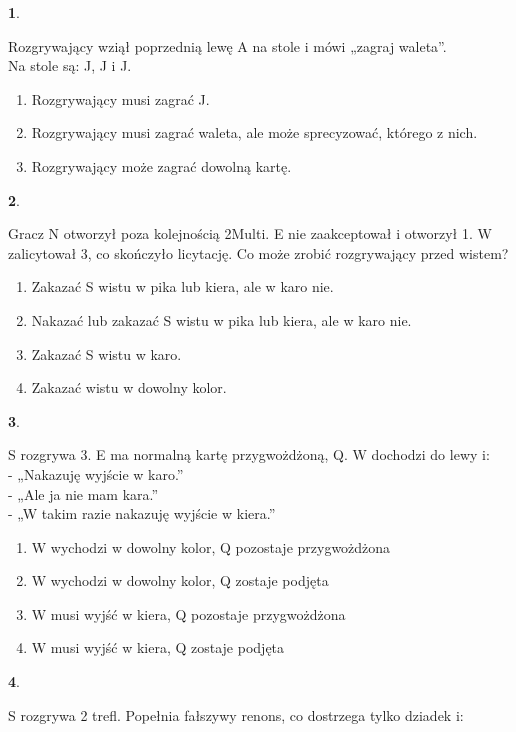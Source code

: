 \documentclass[12pt, a4paper]{article}
\newtheorem{pyt}{}
\begin{document}
\begin{pyt} 
\end{pyt}
Rozgrywający wziął poprzednią lewę \xdiams A na stole i mówi „zagraj waleta”. \\ Na stole są: \xclubs J, \xdiams J i \xspades J.
\begin{enumerate}[label=\alph*.]
\item Rozgrywający musi zagrać \xdiams J.
\item Rozgrywający musi zagrać waleta, ale może sprecyzować, którego z nich.
\item Rozgrywający może zagrać dowolną kartę.
\end{enumerate}


\begin{pyt} 
\end{pyt}
Gracz N otworzył poza kolejnością 2\diams Multi. E nie
zaakceptował i otworzył 1\nt. W zalicytował 3\nt, co skończyło licytację. Co może zrobić rozgrywający przed wistem?
\begin{enumerate}[label=\alph*.]
\item Zakazać S wistu w pika lub kiera, ale w karo nie.
\item Nakazać lub zakazać S wistu w pika lub kiera, ale w karo nie.
\item Zakazać S wistu w karo.
\item Zakazać wistu w dowolny kolor.
\end{enumerate}


\begin{pyt} 
\end{pyt}
S rozgrywa 3\nt. E ma normalną kartę przygwożdżoną, \xdiams Q. W dochodzi do lewy i:\\
- „Nakazuję wyjście w karo.” \\
- „Ale ja nie mam kara.” \\
- „W takim razie nakazuję wyjście w kiera.” \\
\begin{enumerate}[label=\alph*.]
\item W wychodzi w dowolny kolor, \xdiams Q pozostaje przygwożdżona
\item W wychodzi w dowolny kolor, \xdiams Q zostaje podjęta
\item W musi wyjść w kiera, \xdiams Q pozostaje przygwożdżona
\item W musi wyjść w kiera, \xdiams Q zostaje podjęta
\end{enumerate}

\pagebreak
\begin{pyt} 
\end{pyt}
S rozgrywa 2 trefl. Popełnia fałszywy renons, co dostrzega tylko dziadek i:
\end{document}
